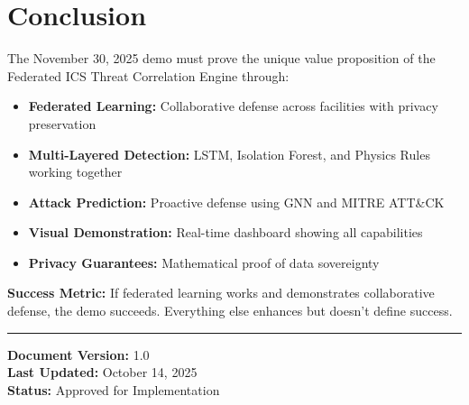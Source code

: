 \documentclass[11pt,a4paper]{article}
\begin{document}
\section{Conclusion}

The November 30, 2025 demo must prove the unique value proposition of the Federated ICS Threat Correlation Engine through:

\begin{itemize}[leftmargin=*]
    \item \textbf{Federated Learning:} Collaborative defense across facilities with privacy preservation
    \item \textbf{Multi-Layered Detection:} LSTM, Isolation Forest, and Physics Rules working together
    \item \textbf{Attack Prediction:} Proactive defense using GNN and MITRE ATT\&CK
    \item \textbf{Visual Demonstration:} Real-time dashboard showing all capabilities
    \item \textbf{Privacy Guarantees:} Mathematical proof of data sovereignty
\end{itemize}

\vspace{1cm}

\noindent\textbf{Success Metric:} If federated learning works and demonstrates collaborative defense, the demo succeeds. Everything else enhances but doesn't define success.

\vspace{1cm}

\noindent\rule{\textwidth}{0.4pt}

\noindent\textbf{Document Version:} 1.0 \\
\textbf{Last Updated:} October 14, 2025 \\
\textbf{Status:} Approved for Implementation
\end{document}
